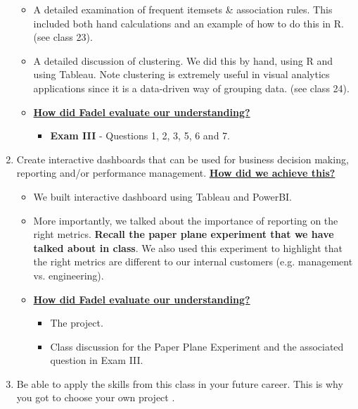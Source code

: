 \documentclass[letterpaper,12pt]{article}
\begin{document}
\begin{enumerate}[label=(\Alph*)]
\begin{itemize}[nosep]
		\item A detailed examination of frequent itemsets \& association rules. This included both hand calculations and an example of how to do this in R. (see class 23).
		\item A detailed discussion of clustering. We did this by hand, using R and using Tableau. Note clustering is extremely useful in visual analytics applications since it is a data-driven way of grouping data. (see class 24).
		\item \textbf{\ul{How did Fadel evaluate our understanding?}}
		\begin{itemize}[nosep]
			\item \textbf{Exam III} - Questions 1, 2, 3, 5, 6 and 7.
		\end{itemize}
	\end{itemize}
	\item Create interactive dashboards that can be used for business decision making, reporting and/or performance management.  \textbf{\ul{How did we achieve this?}}
	\begin{itemize}[nosep]
		\item We built interactive dashboard using Tableau and PowerBI. 
		\item More importantly, we talked about the importance of reporting on the right metrics. \textbf{Recall the paper plane experiment that we have talked about in class}. We also used this experiment to highlight that the right metrics are different to our internal customers (e.g. management vs. engineering).
		\item \textbf{\ul{How did Fadel evaluate our understanding?}}
		\begin{itemize}[nosep]
			\item The project.
			\item Class discussion for the Paper Plane Experiment and the associated question in Exam III.
		\end{itemize}
	\end{itemize}
	\item Be able to apply the skills from this class in your future career. This is why you got to choose your own project \smiley{}.
	
\end{enumerate}
\end{document}
